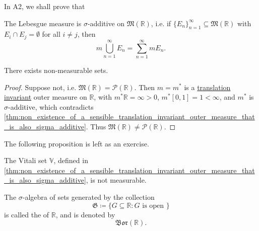 \documentclass[notoc,notitlepage]{tufte-book}
\newcommand{\Bor}{\mathfrak{Bor}}
\begin{document}
In A2, we shall prove that

\begin{thm}\label{thm:_sigma_additivity_of_the_lebesgue_measure_on_lebesgue_measurable_sets}
  The Lebesgue measure is $\sigma$-additive on $\mathfrak{M}(\mathbb{R})$, i.e.
  if $\{ E_n \}_{n=1}^{\infty} \subseteq \mathfrak{M}(\mathbb{R})$ with $E_i
  \cap E_j = \emptyset$ for all $i \neq j$, then
  \begin{equation*}
    m \bigcup_{n=1}^{\infty} E_n = \sum_{n=1}^{\infty} m E_n.
  \end{equation*}
\end{thm}

\begin{crly}\label{crly:existence_of_non_measurable_sets}
  There exists non-measurable sets.
\end{crly}

\begin{proof}
  Suppose not, i.e. $\mathfrak{M}(\mathbb{R}) =
  \mathcal{P}(\mathbb{R})$. Then $m = m^*$ is a
  \hyperref[defn:translation_invariant]{translation invariant} outer measure on
  $\mathbb{R}$, with $m^* \mathbb{R} = \infty > 0$, $m^* [0, 1] = 1 < \infty$,
  and $m^*$ is $\sigma$-additive, which contradicts
  \cref{thm:non_existence_of_a_sensible_translation_invariant_outer_measure_that_is_also_sigma_additive}.
  Thus $\mathfrak{M}(\mathbb{R}) \neq \mathcal{P}(\mathbb{R})$.
\end{proof}

The following proposition is left as an exercise.

\begin{propo}\label{propo:non_measurability_of_the_vitali_set}
  The Vitali set $\mathbb{V}$, defined in
  \cref{thm:non_existence_of_a_sensible_translation_invariant_outer_measure_that_is_also_sigma_additive},
  is not measurable.
\end{propo}


\begin{defn}\label{defn:_sigma_algebra_of_borel_sets}
  The $\sigma$-algebra of sets generated by the collection
  \begin{equation*}
    \mathfrak{G} \coloneqq \{ G \subseteq \mathbb{R} : G \text{ is open } \}
  \end{equation*}
  is called the  of $\mathbb{R}$, and is
  denoted by
  \begin{equation*}
    \Bor(\mathbb{R}).
  \end{equation*}
\end{defn}
\end{document}
